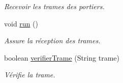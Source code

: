 \begin{DoxyCompactItemize}
\begin{DoxyCompactList}\small\item\em Recevoir les trames des portiers. \end{DoxyCompactList}\item 
void \hyperlink{classcom_1_1lasalle_1_1meeting_1_1_communication_afe29bde1b4538990bd0a8c9b2d512efa}{run} ()
\begin{DoxyCompactList}\small\item\em Assure la réception des trames. \end{DoxyCompactList}\item 
boolean \hyperlink{classcom_1_1lasalle_1_1meeting_1_1_communication_af3090814ffb2fc9537961be52ebd17c2}{verifier\+Trame} (String trame)
\begin{DoxyCompactList}\small\item\em Vérifie la trame. \end{DoxyCompactList}\end{DoxyCompactItemize}
